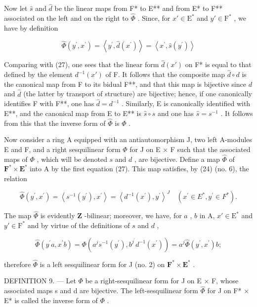 Now let \(\hat{s}\) and \(\hat{d}\) be the linear maps from F* to E** and from E* to F** associated on the left and on the right to \(\hat{\Phi}\) . Since, for \(x' \in \mathrm{E}^*\) and \(y' \in \mathrm{F}^*\) , we have by definition

\[
\hat {\Phi} (y ^ {\prime}, x ^ {\prime}) = \left\langle y ^ {\prime}, \hat {d} (x ^ {\prime}) \right\rangle = \left\langle x ^ {\prime}, \hat {s} (y ^ {\prime}) \right\rangle
\]

Comparing with (27), one sees that the linear form \(\hat{d}(x')\) on F* is equal to that defined by the element \(d^{-1}(x')\) of F. It follows that the composite map \(\hat{d} \circ d\) is the canonical map from F to its bidual F**, and that this map is bijective since \(d\) and \(\hat{d}\) (the latter by transport of structure) are bijective; hence, if one canonically identifies F with F**, one has \(\hat{d} = d^{-1}\) . Similarly, E is canonically identified with E**, and the canonical map from E to E** is \(\hat{s} \circ s\) and one has \(\hat{s} = s^{-1}\) . It follows from this that the inverse form of \(\hat{\Phi}\) is \(\Phi\) .

Now consider a ring A equipped with an antiautomorphism J, two left A-modules E and F, and a right sesquilinear form \(\Phi\) for J on E \(\times\) F such that the associated maps of \(\Phi\) , which will be denoted \(s\) and \(d\) , are bijective. Define a map \(\hat{\Phi}\) of \(\mathbf{F}^{*} \times \mathbf{E}^{*}\) into A by the first equation (27). This map satisfies, by (24) (no. 6), the relation

\[
\hat {\Phi} (y ^ {\prime}, x ^ {\prime}) = \left\langle s ^ {- 1} (y ^ {\prime}), x ^ {\prime} \right\rangle = \left\langle d ^ {- 1} (x ^ {\prime}), y ^ {\prime} \right\rangle^ {J} \quad (x ^ {\prime} \in E ^ {*}, y ^ {\prime} \in F ^ {*}).\tag{28}
\]

The map \(\hat{\Phi}\) is evidently \(\mathbf{Z}\) -bilinear; moreover, we have, for \(a\) , \(b\) in A, \(x' \in \mathrm{E}^*\) and \(y' \in \mathrm{F}^*\) and by virtue of the definitions of \(s\) and \(d\) ,

\[
\widehat {\Phi} (y ^ {\prime} a, x ^ {\prime} b) = \Phi (a ^ {j} s ^ {- 1} (y ^ {\prime}), b ^ {j ^ {\prime}} d ^ {- 1} (x ^ {\prime})) = a ^ {j} \widehat {\Phi} (y ^ {\prime}, x ^ {\prime}) b;
\]

therefore \(\hat{\Phi}\) is a left sesquilinear form for J (no. 2) on \(\mathbf{F}^{*} \times \mathbf{E}^{*}\) .

DEFINITION 9. --- Let \(\Phi\) be a right-sesquilinear form for J on E × F, whose associated maps s and d are bijective. The left-sesquilinear form \(\hat{\Phi}\) for J on F* × E* is called the inverse form of \(\Phi\) .

